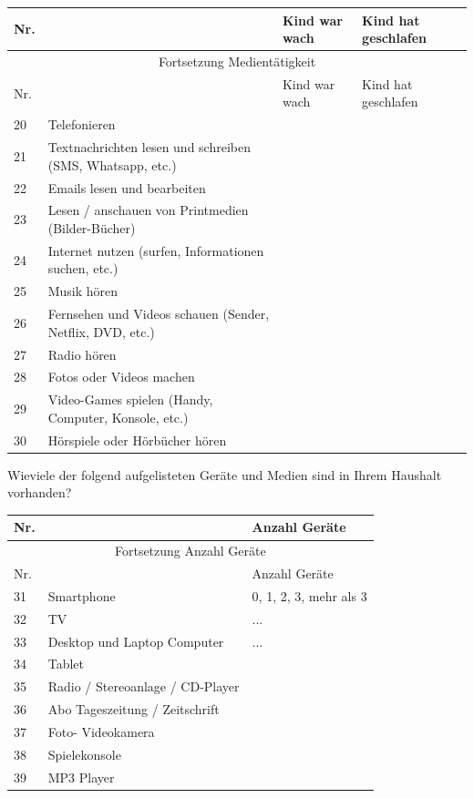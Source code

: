 \begin{flushleft}
\begin{longtable}[c]{ |p{1em}|p{20em}|p{5em}|p{5em}|}

  \hline
  Nr. &  & Kind war wach & Kind hat geschlafen \\
  \hline
  \endfirsthead
 
  \hline
  \multicolumn{4}{|c|}{ Fortsetzung Medientätigkeit}\\
  \hline
   Nr. &  & Kind war wach & Kind hat geschlafen \\
  \hline
  \endhead
 
  \hline
  \endfoot
 
  \hline\hline
  \endlastfoot
  
  
  20 & Telefonieren &  &  \\
  21 & Textnachrichten lesen und schreiben (SMS, Whatsapp, etc.)  &  &  \\
  22 & Emails lesen und bearbeiten &  &  \\
  23 & Lesen / anschauen von Printmedien (Bilder-Bücher) &  &  \\
  24 & Internet nutzen (surfen, Informationen suchen, etc.) &  &  \\
  25 & Musik hören &  &  \\
  26 & Fernsehen und Videos schauen (Sender, Netflix, DVD, etc.) &  &  \\
  27 & Radio hören &  &  \\
  28 & Fotos oder Videos machen &  &  \\
  29 & Video-Games spielen (Handy, Computer, Konsole, etc.) &  &  \\
  30 & Hörspiele oder Hörbücher hören &  &  \\
\end{longtable}

Wieviele der folgend aufgelisteten Geräte und Medien sind in Ihrem Haushalt vorhanden?

\begin{longtable}[c]{ |p{1em}|p{18em}|p{10em}|}
 
  \hline
  Nr. & & Anzahl Geräte \\
  \hline
  \endfirsthead
 
  \hline
  \multicolumn{3}{|c|}{ Fortsetzung Anzahl Geräte}\\
  \hline
   Nr. &  & Anzahl Geräte \\
  \hline
  \endhead
 
  \hline
  \endfoot
 
  \hline\hline
  \endlastfoot
  
  
  31 & Smartphone &  0, 1, 2, 3, mehr als 3 \\
  32 & TV & ... \\
  33 & Desktop und Laptop Computer & ... \\
  34 & Tablet &  \\
  35 & Radio / Stereoanlage / CD-Player &  \\
  36 & Abo Tageszeitung / Zeitschrift &  \\
  37 & Foto- Videokamera &  \\
  38 & Spielekonsole &  \\
  39 & MP3 Player &  \\
\end{longtable}


\end{flushleft}
